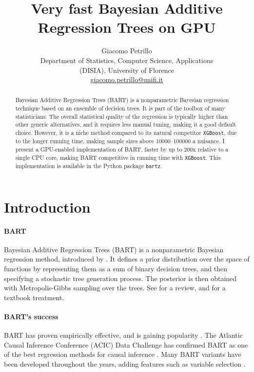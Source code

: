 \documentclass{article}
\title{Very fast Bayesian Additive Regression Trees on GPU}
\author{Giacomo Petrillo\\Department of Statistics, Computer Science,
Applications\\(DISIA), University of Florence\\
\href{mailto:giacomo.petrillo@unifi.it}{giacomo.petrillo@unifi.it}}
\begin{document}
    \maketitle

    \begin{abstract}
        
        Bayesian Additive Regression Trees (BART) is a nonparametric Bayesian regression technique based on an ensemble of decision trees. It is part of the toolbox of many statisticians. The overall statistical quality of the regression is typically higher than other generic alternatives, and it requires less manual tuning, making it a good default choice. However, it is a niche method compared to its natural competitor \texttt{XGBoost}, due to the longer running time, making sample sizes above \num{10000}--\num{100000} a nuisance. I present a GPU-enabled implementation of BART, faster by up to 200x relative to a single CPU core, making BART competitive in running time with \texttt{XGBoost}. This implementation is available in the Python package \texttt{bartz}.

    \end{abstract}

    \section{Introduction}
    \label{sec:intro}

    \paragraph{BART}

    Bayesian Additive Regression Trees (BART) is a nonparametric Bayesian regression method, introduced by \textcite{chipman2006,chipman2010}. It defines a prior distribution over the space of functions by representing them as a sum of binary decision trees, and then specifying a stochastic tree generation process. The posterior is then obtained with Metropolis-Gibbs sampling over the trees. See \textcite{hill2020} for a review, and \textcite[ch.~5]{daniels2023} for a textbook treatment.

    \paragraph{BART's success}
    
    BART has proven empirically effective, and is gaining popularity \autocite[consider, e.g.,][]{tan2019}. The Atlantic Causal Inference Conference (ACIC) Data Challenge has confirmed BART as one of the best regression methods for causal inference \autocite{dorie2019,hahn2019,acic2019,thal2023}. Many BART variants have been developed throughout the years, adding features such as variable selection \autocite{linero2018}.
\end{document}

